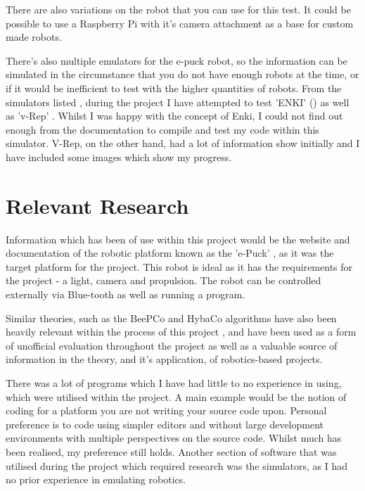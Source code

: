 There are also variations on the robot that you can use for this test.  It
could be possible to use a Raspberry Pi \cite{raspberryPiSite} with it's
camera attachment as a base for custom made robots.

There's also multiple emulators for the e-puck robot, so the information can
be simulated in the circumstance that you do not have enough robots at the
time, or if it would be inefficient to test with the higher quantities of
robots.  From the simulators listed \cite{ePuckSiteSimulators}, during the
project I have attempted to test 'ENKI' (\cite{enkiSite}) as well as 'v-Rep'
\cite{vRepSite}.  Whilst I was happy with the concept of Enki, I could not
find out enough from the documentation to compile and test my code within this
simulator.  V-Rep, on the other hand, had a lot of information show initially
and I have included some images which show my progress.

\section{Relevant Research}
Information which has been of use within this project would be the website and
documentation of the robotic platform known as the 'e-Puck'
\cite{ePuckSite}, as it was the target platform for the project.  This robot
is ideal as it has the requirements for the project - a light, camera and 
propulsion.  The robot can be controlled externally via Blue-tooth as well as
running a program.

Similar theories, such as the BeePCo and HybaCo algorithms
have also been heavily relevant within the process of this project
\cite{Broecker2015Demo,Caliskanelli2015,Lemmens2008}, and have been used as a
form of unofficial evaluation throughout the project as well as a valuable
source of information in the theory, and it's application, of robotics-based
projects.

There was a lot of programs which I have had little to no experience in using,
which were utilised within the project.  A main example would be the notion
of coding for a platform you are not writing your source code upon.
Personal preference is to code using simpler editors and without large
development environments with multiple perspectives on the source code.  Whilst
much has been realised, my preference still holds.  Another section of software
that was utilised during the project which required research was the
simulators, as I had no prior experience in emulating robotics.


